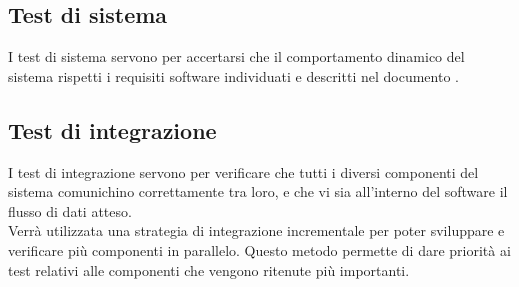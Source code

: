 	\subsection{Test di sistema}
		I test di sistema servono per accertarsi che il comportamento dinamico del sistema rispetti i requisiti software individuati e descritti nel documento \ARdoc.
	\subsection{Test di integrazione}
		I test di integrazione servono per verificare che tutti i diversi componenti del sistema comunichino correttamente tra loro, e che vi sia all'interno del software il flusso di dati atteso. \\
		Verrà utilizzata una strategia di integrazione incrementale per poter sviluppare e verificare più componenti in parallelo. Questo metodo permette di dare priorità ai test relativi alle componenti che vengono ritenute più importanti.
